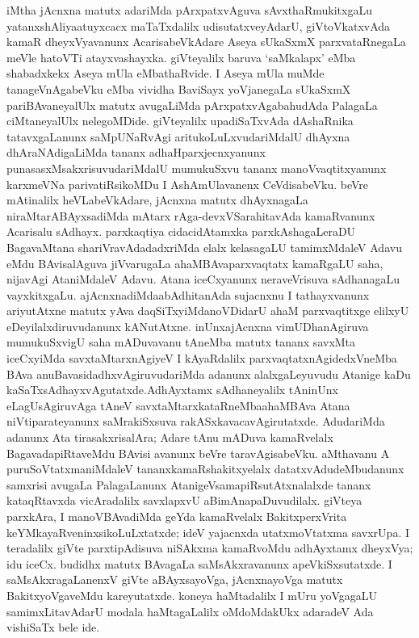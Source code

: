 iMtha jAcnxna matutx adariMda pArxpatxvAguva sAvxthaRmukitxgaLu yatanxshAliya\break atuyxcacx maTaTxdalilx udisutatxveyAdarU, giVtoVkatxvAda kamaR dheyxVyavanunx Acarisa\-beVkAdare Aseya sUkaSxmX parxvataRnegaLa meVle hatoVTi atayxvashayxka. giVteyalilx baruva `saMkalapx' eMba shabadxkekx Aseya mUla eMbathaRvide. I Aseya mUla muMde tanageV\-nAgabeVku eMba vividha BaviSayx yoVjanegaLa sUkaSxmX pariBAvaneyalUlx matutx avugaLiMda pArxpatxvAgabahudAda PalagaLa ciMtaneyalUlx nelegoMDide. giVteyalilx upadiSaTxvAda dAshaRnika tatavxgaLanunx saMpUNaRvAgi aritukoLuLxvudariMdalU dhAyxna dhAraNAdigaLiMda tananx adhaHparxjecnxyanunx punasasxMsakxrisuvudariMdalU mumukuSxvu tananx manoVvaqtitxyanunx karxmeVNa parivatiRsikoMDu I AshAmUlavanenx CeVdisabeVku. beVre mAtinalilx heVLabeVkAdare, jAcnxna matutx dhAyxnagaLa niraMtarABAyxsadiMda mAtarx rAga-devxVSarahitavAda kamaRvanunx Acarisalu sAdhayx. parxkaqtiya cidacidAtamxka parxkAsha\-gaLeraDU BagavaMtana shariVravAdadadxriMda elalx kelasagaLU tamimxMdaleV Adavu eMdu BAvisalAguva jiVvarugaLa ahaMBAvaparxvaqtatx kamaRgaLU saha, nijavAgi Ata\-niMdaleV Adavu. Atana iceCxyanunx neraveVrisuva sAdhanagaLu vayxkitxgaLu. ajAcnxnadiMda\break abAdhitanAda sujacnxnu I tathayxvanunx ariyutAtxne matutx yAva daqSiTxyiMda\break noVDidarU ahaM parxvaqtitxge elilxyU eDeyilalxdiruvudanunx kANutAtxne. inUnx\break  ajAcnxna vimUDhanAgiruva mumukuSxvigU saha mADuvavanu tAneMba matutx tananx savxMta iceCxyiMda savxtaMtarxnAgiyeV I kAyaRdalilx parxvaqtatxnAgidedxVneMba BAva anuBava\-sidadhxvAgiruvudariMda adanunx alalxgaLeyuvudu Atanige kaDu kaSaTxsAdhayxvAgutatxde.\break AdhAyxtamx sAdhaneyalilx tAninUnx eLagUsAgiruvAga tAneV savxtaMtarxkataRneMba\break ahaMBAva Atana niVtiparateyanunx saMrakiSxsuva rakASxkavacavAgirutatxde. AdudariMda adanunx Ata tirasakxrisalAra; Adare tAnu mADuva kamaRvelalx BagavadapiRtaveMdu BAvisi avanunx beVre taravAgisabeVku. aMthavanu A puruSoVtatxmaniMdaleV tananx\break kamaRshakitxyelalx datatxvAdudeMbudanunx samxrisi avugaLa PalagaLanunx AtanigeV\break samapiRsutAtxnalalxde tananx kataqRtavxda vicAradalilx savxlapxvU aBimAnapaDuvudilalx. giVteya parxkAra, I manoVBAvadiMda geYda kamaRvelalx BakitxperxVrita keYMkayaRveninxsikoLuLxtatxde; ideV yajacnxda utatxmoVtatxma savxrUpa. I teradalilx giVte parxtipAdisuva niSAkxma kamaR\-voMdu adhAyxtamx dheyxVya; idu iceCx. budidhx matutx BAvagaLa saMsAkxravanunx apeVkiSxsu\-tatxde. I saMsAkxragaLanenxV giVte aBAyxsayoVga, jAcnxnayoVga matutx BakitxyoVgaveMdu kareyutatxde. koneya haMtadalilx I mUru yoVgagaLU samimxLitavAdarU modala haMtagaLalilx oMdoMdakUkx adaradeV Ada vishiSaTx bele ide.

